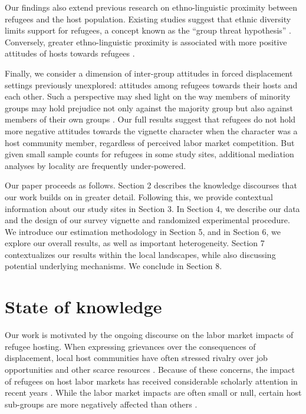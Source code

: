 \documentclass[a4paper,12pt]{article}
\begin{document}
Our findings also extend previous research on ethno-linguistic proximity between refugees and the host population. Existing studies suggest that ethnic diversity limits support for refugees, a concept known as the ``group threat hypothesis'' \citep{steele2019ethnic}.  Conversely, greater ethno-linguistic proximity is associated with more positive attitudes of hosts towards refugees \citep{betts2023refugees}. 

Finally, we consider a dimension of inter-group attitudes in forced displacement settings previously unexplored: attitudes among refugees towards their hosts and each other. Such a perspective may shed light on the way members of minority groups may hold prejudice not only against the majority group but also against members of their own groups \citep{perlmutter2002}. Our full results suggest that refugees do not hold more negative attitudes towards the vignette character when the character was a host community member, regardless of perceived labor market competition. But given small sample counts for refugees in some study sites, additional mediation analyses by locality are frequently under-powered. 

Our paper proceeds as follows. Section 2 describes the knowledge discourses that our work builds on in greater detail. Following this, we provide contextual information about our study sites in Section 3. In Section 4, we describe our data and the design of our survey vignette and randomized experimental procedure. We introduce our estimation methodology in Section 5, and in Section 6, we explore our overall results, as well as important heterogeneity. Section 7 contextualizes our results within the local landscapes, while also discussing potential underlying mechanisms. We conclude in Section 8. 




\section{State of knowledge}

\noindent Our work is motivated by the ongoing discourse on the labor market impacts of refugee hosting. When expressing grievances over the consequences of displacement, local host communities have often stressed rivalry over job opportunities and other scarce resources \citep{baylouny2020, fajth2019}. Because of these concerns, the impact of refugees on host labor markets has received considerable scholarly attention in recent years \citep{aksu2022, caruso2021, maystadt2014winners, ruiz2016labour, fallah2019impact}. While the labor market impacts are often small or null, certain host sub-groups are more negatively affected than others \citep{maystadt2014winners, ruiz2018, Goltz2023jobs}. 
\end{document}

